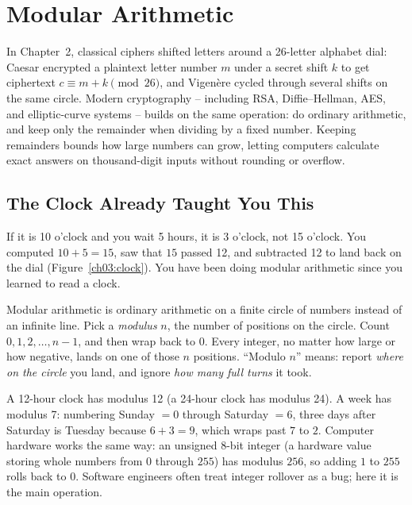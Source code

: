 \chapter{Modular Arithmetic}

In Chapter~2, classical ciphers shifted letters around a 26-letter alphabet dial: Caesar encrypted a plaintext letter number $m$ under a secret shift $k$ to get ciphertext $c \equiv m + k \pmod{26}$, and Vigen\`ere cycled through several shifts on the same circle. Modern cryptography -- including RSA, Diffie--Hellman, AES, and elliptic-curve systems -- builds on the same operation: do ordinary arithmetic, and keep only the remainder when dividing by a fixed number. Keeping remainders bounds how large numbers can grow, letting computers calculate exact answers on thousand-digit inputs without rounding or overflow.

\chapterline

\section{The Clock Already Taught You This}

If it is 10 o'clock and you wait 5 hours, it is 3 o'clock, not 15 o'clock. You computed $10 + 5 = 15$, saw that $15$ passed 12, and subtracted 12 to land back on the dial (Figure~\ref{ch03:clock}). You have been doing modular arithmetic since you learned to read a clock.

\begin{intuitionbox}
Modular arithmetic is ordinary arithmetic on a finite circle of numbers instead of an infinite line. Pick a \emph{modulus} $n$, the number of positions on the circle. Count $0, 1, 2, \dots, n-1$, and then wrap back to $0$. Every integer, no matter how large or how negative, lands on one of those $n$ positions. ``Modulo $n$'' means: report \emph{where on the circle} you land, and ignore \emph{how many full turns} it took.
\end{intuitionbox}

A 12-hour clock has modulus 12 (a 24-hour clock has modulus 24). A week has modulus 7: numbering Sunday $= 0$ through Saturday $= 6$, three days after Saturday is Tuesday because $6 + 3 = 9$, which wraps past $7$ to $2$. Computer hardware works the same way: an unsigned 8-bit integer (a hardware value storing whole numbers from $0$ through $255$) has modulus $256$, so adding $1$ to $255$ rolls back to $0$. Software engineers often treat integer rollover as a bug; here it is the main operation.

